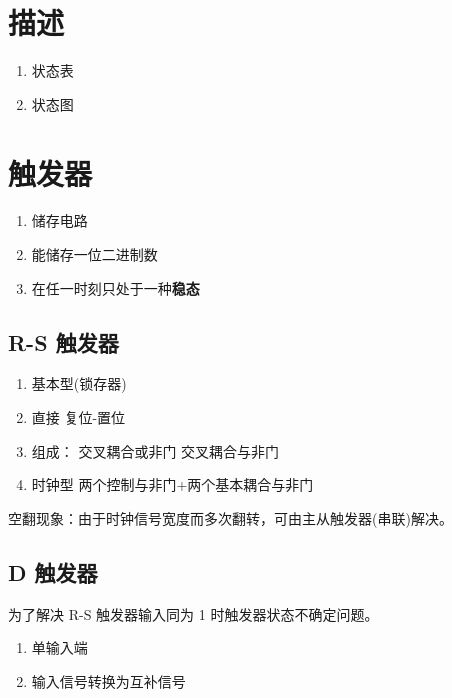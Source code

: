 \section{描述}

\begin{enumerate}
    \item 状态表
    \item 状态图
\end{enumerate}

\newpage

\section{触发器}

\begin{enumerate}
    \item 储存电路
    \item 能储存一位二进制数
    \item 在任一时刻只处于一种\textbf{稳态}
\end{enumerate}

\subsection{R-S 触发器}

\begin{enumerate}
    \item 基本型(锁存器)
    \item 直接 复位-置位
    \item 组成：
          交叉耦合或非门
          交叉耦合与非门
    \item 时钟型
          两个控制与非门+两个基本耦合与非门
\end{enumerate}

空翻现象：由于时钟信号宽度而多次翻转，可由主从触发器(串联)解决。

\newpage

\subsection{D 触发器}

为了解决 R-S 触发器输入同为 1 时触发器状态不确定问题。

\begin{enumerate}
    \item 单输入端
    \item 输入信号转换为互补信号
\end{enumerate}

